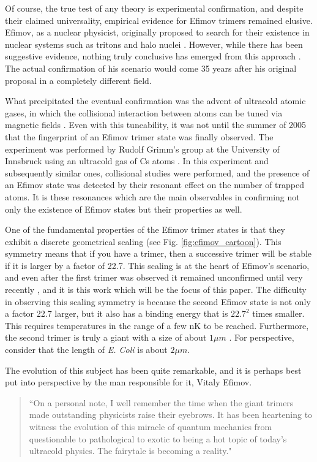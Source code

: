 \documentclass[prl,onecolumn,amsmath,amssymb,titlepage,nofootinbib,preprint]{revtex4-1}
\begin{document}
	Of course, the true test of any theory is experimental confirmation, and despite their claimed universality, empirical evidence for Efimov trimers remained elusive.  Efimov, as a nuclear physicist, originally proposed to search for their existence in nuclear systems such as tritons and halo nuclei \cite{Efimov1970}\cite{Efimov1971}. However, while there has been suggestive evidence, nothing truly conclusive has emerged from this approach \cite{Braaten_2006}.  The actual confirmation of his scenario would come 35 years after his original proposal in a completely different field.
	
	What precipitated the eventual confirmation was the advent of ultracold atomic gases, in which the collisional interaction between atoms can be tuned via magnetic fields \cite{Modungo2014}.  Even with this tuneability, it was not until the summer of 2005 that the fingerprint of an Efimov trimer state was finally observed. The experiment was performed by Rudolf Grimm's group at the University of Innsbruck using an ultracold gas of Cs atoms \cite{Kraemer2006_1st_observ}.  In this experiment and subsequently similar ones, collisional studies were performed, and the presence of an Efimov state was detected by their resonant effect on the number of trapped atoms.  It is these resonances which are the main observables in confirming not only the existence of Efimov states but their properties as well. 
	
	One of the fundamental properties of the Efimov trimer states is that they exhibit a discrete geometrical scaling (see Fig. \ref{fig:efimov_cartoon}).  This symmetry means that if you have a trimer, then a successive trimer will be stable if it is larger by a factor of 22.7. This scaling is at the heart of Efimov's scenario, and even after the first trimer was observed it remained unconfirmed until very recently \cite{Huang2014}, and it is this work which will be the focus of this paper. The difficulty in observing this scaling symmetry is because the second Efimov state is not only a factor 22.7 larger, but it also has a binding energy that is $22.7^{2}$ times smaller.  This requires temperatures in the range of a few nK to be reached.  Furthermore, the second trimer is truly a giant with a size of about $1 \mu m$ \cite{Huang2014}.  For perspective, consider that the length of \textit{E. Coli} is about $2 \mu m$.
	
	The evolution of this subject has been quite remarkable, and it is perhaps best put into perspective by the man responsible for it, Vitaly Efimov.
	\begin{quote}
		``On a personal note, I well remember the time when the giant trimers made outstanding physicists raise their eyebrows. It has been heartening to witness the evolution of this miracle of quantum mechanics from questionable to pathological to exotic to being a hot topic of today's ultracold physics. The fairytale is becoming a reality."\cite{Efimov2009}
	\end{quote}
	
\end{document}
